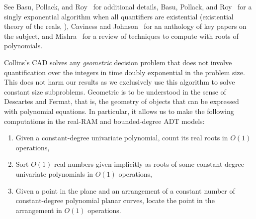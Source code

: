 See
Basu, Pollack, and Roy~\cite{BPR06} for additional details,
Basu, Pollack, and Roy~\cite{BPR96b} for a singly exponential algorithm when all
quantifiers are existential
(existential theory of the reals, \ETR{}),
Caviness and Johnson~\cite{CJ12} for an anthology of key papers on the subject,
and Mishra~\cite{M04} for a review of techniques to compute with roots of
polynomials.

Collins's CAD solves any \emph{geometric} decision problem that does not involve
quantification over the integers in time doubly exponential in the problem
size. This does not harm our results as we exclusively use this algorithm to
solve constant size subproblems. Geometric is to be understood in the sense of Descartes and Fermat, that
is, the geometry of objects that can be expressed with polynomial equations. In
particular, it allows us to make the following computations in the real-RAM and
bounded-degree ADT models:
\begin{enumerate}
\setlength{\itemsep}{0pt}
\setlength{\parskip}{0pt}
\setlength{\parsep}{0pt}
\item Given a constant-degree univariate polynomial, count its real roots
	in $O(1)$ operations,
\item Sort $O(1)$ real numbers given implicitly as roots of some
	constant-degree univariate polynomials in $O(1)$ operations,
\item Given a point in the plane and an arrangement of a constant number of
constant-degree polynomial planar curves, locate the point in the
arrangement in $O(1)$ operations.
\end{enumerate}


